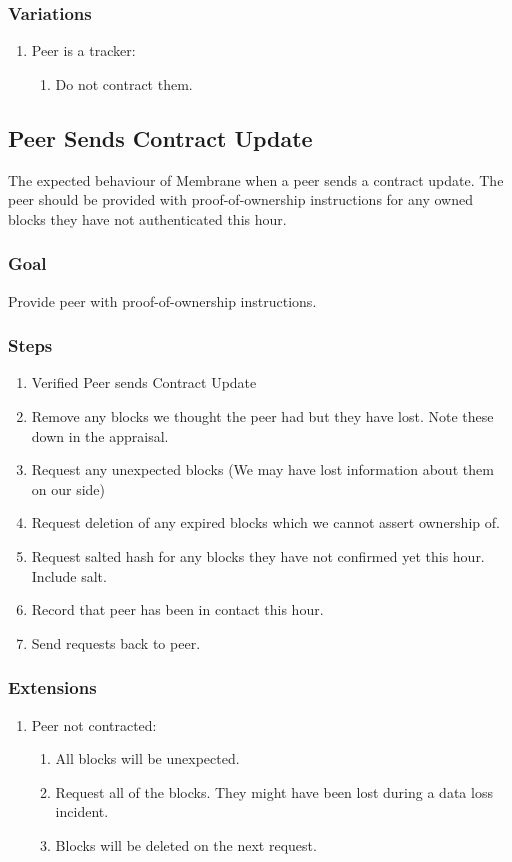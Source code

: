 \documentclass[11pt, a4paper, twoside]{report}
\begin{document}
\subsubsection{Variations}
\begin{enumerate}
  \item Peer is a tracker:
	\begin{enumerate}
	  \item Do not contract them.
	\end{enumerate}
\end{enumerate}

\subsection{Peer Sends Contract Update}

The expected behaviour of Membrane when a peer sends a contract update. The peer should be provided with proof-of-ownership instructions for any owned blocks they have not authenticated this hour.

\subsubsection{Goal}

Provide peer with proof-of-ownership instructions.

\subsubsection{Steps}

\begin{enumerate}
 \item Verified Peer sends Contract Update
 \item Remove any blocks we thought the peer had but they have lost. Note these down in the appraisal.
 \item Request any unexpected blocks (We may have lost information about them on our side)
 \item Request deletion of any expired blocks which we cannot assert ownership of.
 \item Request salted hash for any blocks they have not confirmed yet this hour. Include salt.
 \item Record that peer has been in contact this hour.
 \item Send requests back to peer.
\end{enumerate}

\subsubsection{Extensions}
\begin{enumerate}
  \item Peer not contracted:
	\begin{enumerate}
	  \item All blocks will be unexpected.
	  \item Request all of the blocks. They might have been lost during a data loss incident.
	  \item Blocks will be deleted on the next request.
	\end{enumerate}
\end{enumerate}
\end{document}
